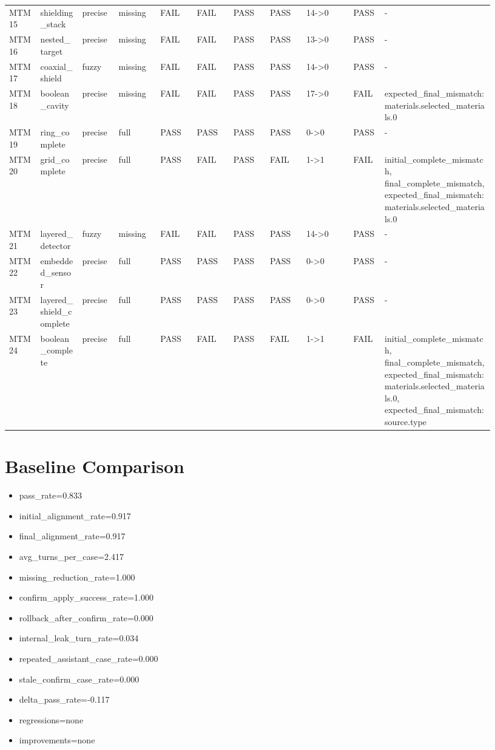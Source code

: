 \documentclass[11pt]{ctexart}
\begin{document}
\begin{longtable}{p{0.06\linewidth}p{0.08\linewidth}p{0.07\linewidth}p{0.08\linewidth}p{0.07\linewidth}p{0.07\linewidth}p{0.07\linewidth}p{0.07\linewidth}p{0.09\linewidth}p{0.06\linewidth}p{0.21\linewidth}}
MTM15 & shielding\_stack & precise & missing & FAIL & FAIL & PASS & PASS & 14->0 & PASS & - \\
MTM16 & nested\_target & precise & missing & FAIL & FAIL & PASS & PASS & 13->0 & PASS & - \\
MTM17 & coaxial\_shield & fuzzy & missing & FAIL & FAIL & PASS & PASS & 14->0 & PASS & - \\
MTM18 & boolean\_cavity & precise & missing & FAIL & FAIL & PASS & PASS & 17->0 & FAIL & expected\_final\_mismatch:materials.selected\_materials.0 \\
MTM19 & ring\_complete & precise & full & PASS & PASS & PASS & PASS & 0->0 & PASS & - \\
MTM20 & grid\_complete & precise & full & PASS & FAIL & PASS & FAIL & 1->1 & FAIL & initial\_complete\_mismatch, final\_complete\_mismatch, expected\_final\_mismatch:materials.selected\_materials.0 \\
MTM21 & layered\_detector & fuzzy & missing & FAIL & FAIL & PASS & PASS & 14->0 & PASS & - \\
MTM22 & embedded\_sensor & precise & full & PASS & PASS & PASS & PASS & 0->0 & PASS & - \\
MTM23 & layered\_shield\_complete & precise & full & PASS & PASS & PASS & PASS & 0->0 & PASS & - \\
MTM24 & boolean\_complete & precise & full & PASS & FAIL & PASS & FAIL & 1->1 & FAIL & initial\_complete\_mismatch, final\_complete\_mismatch, expected\_final\_mismatch:materials.selected\_materials.0, expected\_final\_mismatch:source.type \\
\bottomrule
\end{longtable}
\section{Baseline Comparison}
\begin{itemize}
\item pass\_rate=0.833
\item initial\_alignment\_rate=0.917
\item final\_alignment\_rate=0.917
\item avg\_turns\_per\_case=2.417
\item missing\_reduction\_rate=1.000
\item confirm\_apply\_success\_rate=1.000
\item rollback\_after\_confirm\_rate=0.000
\item internal\_leak\_turn\_rate=0.034
\item repeated\_assistant\_case\_rate=0.000
\item stale\_confirm\_case\_rate=0.000
\item delta\_pass\_rate=-0.117
\item regressions=none
\item improvements=none
\end{itemize}
\appendix
\end{document}
